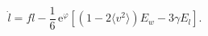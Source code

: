 \begin{equation}
\dot l
   =  fl
     -\frac{1}{6}\,\mathrm{e}^\varphi 
      \left[ (1-2\langle v^2 \rangle ) E_w -3\gamma E_l
      \right]. 
\end{equation}

